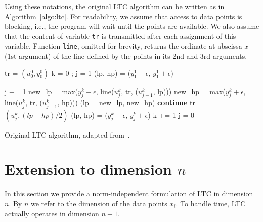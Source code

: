 \documentclass[10pt, conference, compsocconf]{IEEEtran}
\newcommand{\todo}[1]{\marginpar{\parbox{18mm}{\flushleft\tiny\color{red}\textbf{TODO}:
      #1}}}
\begin{document}
Using these notations, the original LTC algorithm can 
be written as in Algorithm~\ref{algo:ltc}. For readability, we assume 
that access to data points is blocking, i.e., the program will wait 
until the points are available. We also assume that the content of 
variable \texttt{tr} is transmitted after each assignment of this 
variable. Function \texttt{line}, omitted for brevity, returns the 
ordinate at abscissa $x$ (1st argument) of the line defined by the points
in its 2nd and 3rd arguments.

\begin{algorithm}
\begin{algorithmic}[1]
\State tr = $(u^0_0, y^0_0)$ 
\State k = 0 ; j = 1
\State (lp, hp) = ($y^1_1 - \epsilon$, $y^1_1 + \epsilon$) 

 
    \State j += 1
    \State new\_lp = max($y^k_j-\epsilon$, line($u^k_j$, tr, ($u^k_{j-1}$, lp)))
    \State new\_hp = max($y^k_j+\epsilon$, line($u^k_j$, tr, ($u^k_{j-1}$, hp)))
     
        \State (lp = new\_lp, new\_hp)
        \State \textbf{continue}
    \EndIf
    \State tr = $(u^k_j, (lp+hp)/2)$
    \State (lp, hp) = ($y^k_j-\epsilon$, $y^k_j+\epsilon$)
    \State k += 1
    \State j = 0
\EndWhile
\end{algorithmic}
\caption{Original LTC algorithm, adapted from~\cite{schoellhammer2004lightweight}.}
\label{algo:ltc}
\end{algorithm}




\section{Extension to dimension $n$}
\label{sec:extension}
In this section we provide a norm-independent formulation of LTC in 
dimension $n$. By $n$ we refer to the dimension of the data points 
$x_i$. To handle time, LTC actually operates in dimension 
$n+1$. 
\end{document}
